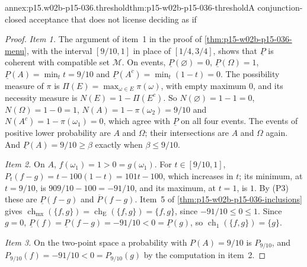 \begin{annexitem}{annex:p15.w02b-p15-036.threshold}{thm:p15-w02b-p15-036-threshold}{A conjunction-closed acceptance that does not license deciding as if}
\begin{proof}
\emph{Item 1.} The argument of item~1 in the proof of
\cref{thm:p15-w02b-p15-036-menu}, with the interval \([9/10,1]\) in place
of \([1/4,3/4]\), shows that \(\underline P\) is coherent with compatible
set \(\mathcal M\). On events, \(\underline P(\varnothing)=0\),
\(\underline P(\Omega)=1\), \(\underline P(A)=\min_tt=9/10\) and
\(\underline P(A^c)=\min_t(1-t)=0\). The possibility measure of \(\pi\) is
\(\Pi(E)=\max_{\omega\in E}\pi(\omega)\), with empty maximum \(0\), and its
necessity measure is \(N(E)=1-\Pi(E^c)\). So \(N(\varnothing)=1-1=0\),
\(N(\Omega)=1-0=1\), \(N(A)=1-\pi(\omega_2)=9/10\) and
\(N(A^c)=1-\pi(\omega_1)=0\), which agree with \(\underline P\) on all
four events. The events of positive lower probability are \(A\) and
\(\Omega\); their intersections are \(A\) and \(\Omega\) again. And
\(\underline P(A)=9/10\geq\beta\) exactly when \(\beta\leq9/10\).

\emph{Item 2.} On \(A\), \(f(\omega_1)=1>0=g(\omega_1)\). For
\(t\in[9/10,1]\), \(P_t(f-g)=t-100(1-t)=101t-100\), which increases in
\(t\); its minimum, at \(t=9/10\), is \(909/10-100=-91/10\), and its
maximum, at \(t=1\), is \(1\). By (P3) these are \(\underline P(f-g)\) and
\(\overline P(f-g)\). Item~5 of \cref{thm:p15-w02b-p15-036-inclusions}
gives \(\operatorname{ch}_{\mathrm{mx}}(\{f,g\})=
\operatorname{ch}_{\mathrm E}(\{f,g\})=\{f,g\}\), since
\(-91/10\leq0\leq1\). Since \(g=0\), \(\underline P(f)=\underline P(f-g)
=-91/10<0=\underline P(g)\), so \(\operatorname{ch}_1(\{f,g\})=\{g\}\).

\emph{Item 3.} On the two-point space a probability with
\(P(A)=9/10\) is \(P_{9/10}\), and \(P_{9/10}(f)=-91/10<0=P_{9/10}(g)\) by
the computation in item~2.
\end{proof}
\end{annexitem}

